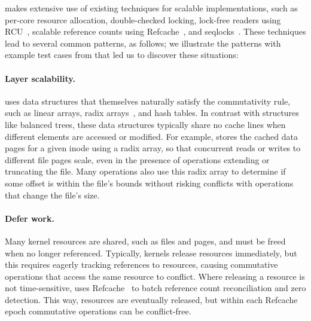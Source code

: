 \fs makes extensive use of existing techniques for scalable
implementations, such as per-core resource
allocation, double-checked locking, lock-free readers using
RCU~\cite{rcu:linux},
scalable reference counts using Refcache~\cite{clements:radixvm},
and seqlocks~\cite[\S6]{lameter:linuxsync}.  These techniques lead to
several common patterns, as follows; we illustrate the patterns with
example test cases from \tool{} that led us to discover these situations:


\paragraph{Layer scalability.}  \fs uses data structures that
themselves naturally satisfy the commutativity rule, such as linear
arrays, radix arrays~\cite{clements:radixvm}, and hash tables.  In
contrast with structures like balanced trees, these data
structures
typically share no cache lines when different elements are accessed
or modified.  For example, \fs stores the cached data pages for a given inode
using a radix array, so that concurrent reads or writes to different
file pages scale, even in the presence of operations
extending or truncating the file.
Many operations also use this radix array to determine if some offset
is within the file's bounds without risking conflicts with operations
that change the file's size.



\paragraph{Defer work.}  \cbstart Many kernel resources are shared,
such as files and pages, and must be freed when no longer referenced.
Typically, kernels release resources immediately, but this requires
eagerly tracking references to resources, causing
commutative operations that access the same resource to conflict.  Where
releasing a resource is not time-sensitive, \fs
uses Refcache~\cite{clements:radixvm} to batch reference count
reconciliation and zero detection.  This way, resources are eventually
released, but within each Refcache epoch commutative operations can be
conflict-free. \cbend



